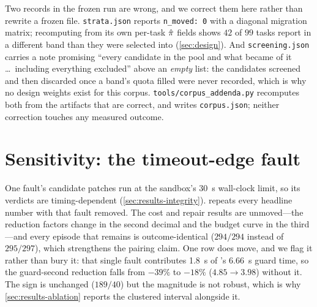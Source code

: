 Two records in the frozen run are wrong, and we correct them here rather than
rewrite a frozen file. \texttt{strata.json} reports \texttt{n\_moved: 0} with a
diagonal migration matrix; recomputing from its own per-task $\hat{\pi}$ fields
shows $42$ of $99$ tasks report in a different band than they were selected
into (\cref{sec:design}). And \texttt{screening.json} carries a note promising
``every candidate in the pool and what became of it \dots\ including everything
excluded'' above an \emph{empty} list: the candidates screened and then
discarded once a band's quota filled were never recorded, which is why no
design weights exist for this corpus. \texttt{tools/corpus\_addenda.py}
recomputes both from the artifacts that are correct, and writes
\texttt{corpus.json}; neither correction touches any measured outcome.

\section{Sensitivity: the timeout-edge fault}
\label{app:sensitivity}

One fault's candidate patches run at the sandbox's \SI{30}{\second}
wall-clock limit, so its verdicts are timing-dependent
(\cref{sec:results-integrity}).  repeats every headline
number with that fault removed. The cost and repair results are unmoved---the
reduction factors change in the second decimal and the budget curve in the
third---and every episode that remains is outcome-identical ($294/294$ instead
of $295/297$), which strengthens the pairing claim. One row does move, and we
flag it rather than bury it: that single fault contributes \SI{1.8}{\second} of
\armuntyped's \SI{6.66}{\second} guard time, so the guard-second reduction
falls from $-39\%$ to $-18\%$ ($\num{4.85} \to \num{3.98}$) without it. The
sign is unchanged ($189/40$) but the magnitude is not robust, which is why
\cref{sec:results-ablation} reports the clustered interval alongside it.

